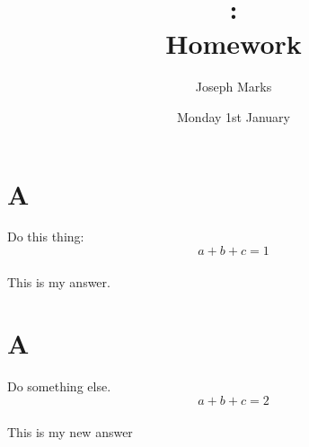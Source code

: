 \documentclass{article}
\date{Monday 1st January}
\author{Joseph Marks}
\title{\modulecode: \modulename \\ \large Homework \hwknumber}
\begin{document}
\maketitle 
\thispagestyle{empty}



\part{A}
Do this thing:
\begin{equation*}
a + b + c = 1
\end{equation*}
\sol\\[5px]
This is my answer.

\part{A}
Do something else.
\begin{equation*}
a + b + c = 2
\end{equation*}
\sol\\[5px]
This is my new answer
\end{document}
